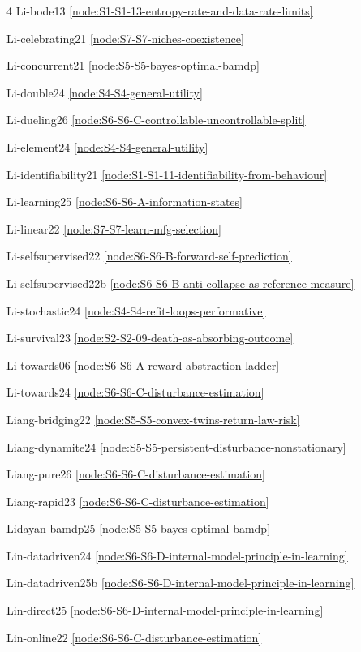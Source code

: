 \documentclass[10pt]{article}
\begin{document}
{\begin{multicols}{4}
Li-bode13 \hfill \ref{node:S1-S1-13-entropy-rate-and-data-rate-limits}\par
Li-celebrating21 \hfill \ref{node:S7-S7-niches-coexistence}\par
Li-concurrent21 \hfill \ref{node:S5-S5-bayes-optimal-bamdp}\par
Li-double24 \hfill \ref{node:S4-S4-general-utility}\par
Li-dueling26 \hfill \ref{node:S6-S6-C-controllable-uncontrollable-split}\par
Li-element24 \hfill \ref{node:S4-S4-general-utility}\par
Li-identifiability21 \hfill \ref{node:S1-S1-11-identifiability-from-behaviour}\par
Li-learning25 \hfill \ref{node:S6-S6-A-information-states}\par
Li-linear22 \hfill \ref{node:S7-S7-learn-mfg-selection}\par
Li-selfsupervised22 \hfill \ref{node:S6-S6-B-forward-self-prediction}\par
Li-selfsupervised22b \hfill \ref{node:S6-S6-B-anti-collapse-as-reference-measure}\par
Li-stochastic24 \hfill \ref{node:S4-S4-refit-loops-performative}\par
Li-survival23 \hfill \ref{node:S2-S2-09-death-as-absorbing-outcome}\par
Li-towards06 \hfill \ref{node:S6-S6-A-reward-abstraction-ladder}\par
Li-towards24 \hfill \ref{node:S6-S6-C-disturbance-estimation}\par
Liang-bridging22 \hfill \ref{node:S5-S5-convex-twins-return-law-risk}\par
Liang-dynamite24 \hfill \ref{node:S5-S5-persistent-disturbance-nonstationary}\par
Liang-pure26 \hfill \ref{node:S6-S6-C-disturbance-estimation}\par
Liang-rapid23 \hfill \ref{node:S6-S6-C-disturbance-estimation}\par
Lidayan-bamdp25 \hfill \ref{node:S5-S5-bayes-optimal-bamdp}\par
Lin-datadriven24 \hfill \ref{node:S6-S6-D-internal-model-principle-in-learning}\par
Lin-datadriven25b \hfill \ref{node:S6-S6-D-internal-model-principle-in-learning}\par
Lin-direct25 \hfill \ref{node:S6-S6-D-internal-model-principle-in-learning}\par
Lin-online22 \hfill \ref{node:S6-S6-C-disturbance-estimation}\par

\end{multicols}}
\end{document}
